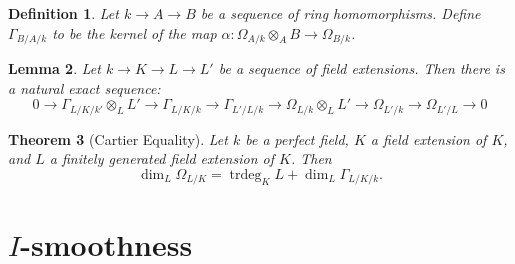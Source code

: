\documentclass[10pt]{article}
\theoremstyle{thmstyle}
\newtheorem{theorem}{Theorem}[section]
\newtheorem{lemma}[theorem]{Lemma}
\theoremstyle{defstyle}
\newtheorem{definition}[theorem]{Definition}
\newcommand{\trdeg}{\operatorname{trdeg}}
\begin{document}
\begin{definition}
    Let $k\to A\to B$ be a sequence of ring homomorphisms. Define $\Gamma_{B/A/k}$ to be the kernel of the map $\alpha\colon\Omega_{A/k}\otimes_A B\to\Omega_{B/k}$. 
\end{definition}

\begin{lemma}
    Let $k\to K\to L\to L'$ be a sequence of field extensions. Then there is a natural exact sequence: 
    \begin{equation*}
        0\to\Gamma_{L/K/k'}\otimes_L L'\to\Gamma_{L/K/k}\to\Gamma_{L'/L/k}\to\Omega_{L/k}\otimes_L L'\to\Omega_{L'/k}\to\Omega_{L'/L}\to 0
    \end{equation*}
\end{lemma}

\begin{theorem}[Cartier Equality]
    Let $k$ be a perfect field, $K$ a field extension of $K$, and $L$ a finitely generated field extension of $K$. Then 
    \begin{equation*}
        \dim_L \Omega_{L/K} = \trdeg_K L + \dim_L\Gamma_{L/K/k}.
    \end{equation*}
\end{theorem}


\section{\texorpdfstring{$I$}{I}-smoothness}




\end{document}

